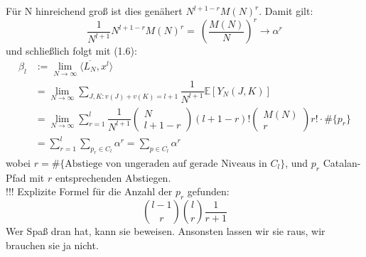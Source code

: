 \documentclass[a4paper, 11pt]{scrreprt}
\newcommand{\EE}{\mathbb{E}}
\begin{document}
Für N hinreichend groß ist dies genähert \(N^{l+1-r}M(N)^r\). Damit gilt:
	\begin{equation}
		\frac {1}{N^{l+1}} N^{l+1-r}M(N)^r =~ \left( \dfrac{M(N)}{N}\right)^{r}\to \alpha^r
	\end{equation}
und schließlich folgt mit (1.6):
	\begin{align*}
		\beta_l &:= \lim_{N\to\infty} \langle \overline{L_N}, x^l \rangle\\
		&= \lim_{N \to \infty} \sum_{J,K: v(J)+v(K) = l+1} \dfrac{1}{N^{l+1}}\EE[Y_N(J,K)]\\
		&= \lim_{N \to \infty} \sum_{r=1}^{l} \dfrac{1}{N^{l+1}} \begin{pmatrix} N\\ l+1-r\end{pmatrix} (l+1-r)! \begin{pmatrix} M(N)\\r\end{pmatrix} r!	\cdot \#\{p_r \}\\
		&= \sum_{r=1}^{l} \sum_{p_{r} \in C_{l}} \alpha^{r} = \sum_{p\in C_l} \alpha^r
	\end{align*}
wobei \(r=\#\{\text{Abstiege von ungeraden auf gerade Niveaus in } C_l\}\), und \(p_r\) Catalan-Pfad mit \(r\) entsprechenden Abstiegen.\\

!!! Explizite Formel für die Anzahl der $ p_r $ gefunden: \[ \binom{l-1}{r} \binom{l}{r} \frac{1}{r+1} \]
Wer Spaß dran hat, kann sie beweisen. Ansonsten lassen wir sie raus, wir brauchen sie ja nicht.\\







\end{document}
